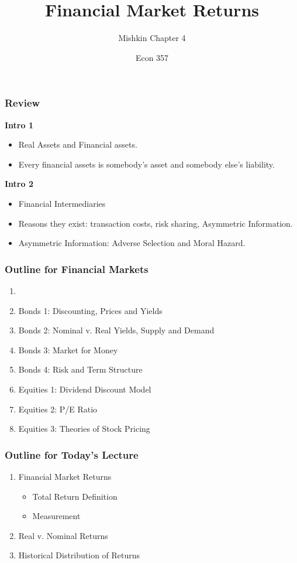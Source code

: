 \documentclass{beamer}
\title{Financial Market Returns}
\subtitle{Mishkin Chapter 4}
\author{Econ 357}
\date{\week}
\begin{document}
\frame{\titlepage}

\begin{frame}[t]
    \frametitle{Review}
        \textbf{Intro 1}
            \begin{itemize}
                \item Real Assets and Financial assets.
                \item Every financial assets is somebody's asset and somebody else's liability.
            \end{itemize}

        \vspace{1em}

        \textbf{Intro 2}
            \begin{itemize}
                \item Financial Intermediaries
                \item Reasons they exist: transaction costs, risk sharing, Asymmetric Information.
                \item Asymmetric Information: Adverse Selection and Moral Hazard.
            \end{itemize}

\end{frame}

\begin{frame}
    \frametitle{Outline for Financial Markets}
        \begin{enumerate}
            \item {}
            \item Bonds 1: Discounting, Prices and Yields
            \item Bonds 2: Nominal v. Real Yields, Supply and Demand
            \item Bonds 3: Market for Money
            \item Bonds 4: Risk and Term Structure
            \item Equities 1: Dividend Discount Model
            \item Equities 2: P/E Ratio
            \item Equities 3: Theories of Stock Pricing
            
        \end{enumerate}
\end{frame}


\begin{frame}
    \frametitle{Outline for Today's Lecture}
    \begin{enumerate}
        \item Financial Market Returns
        \begin{itemize}
            \item Total Return Definition
            \item Measurement
        \end{itemize}
        \item Real v. Nominal Returns
        \item Historical Distribution of Returns
    \end{enumerate}
\end{frame}
\end{document}

